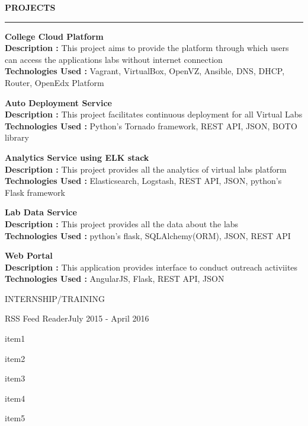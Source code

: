 \documentclass{resume} %
\begin{document}

\textbf{PROJECTS}
\sectionlineskip
\hrule
\textbf{College Cloud Platform} \\
\textbf{Description :} This project aims to provide the platform through which users can access the
applications labs without internet connection \\
\textbf{Technologies Used :} Vagrant, VirtualBox, OpenVZ, Ansible, DNS, DHCP,
Router, OpenEdx Platform

\textbf{Auto Deployment Service} \\
\textbf{Description :} This project facilitates continuous deployment for all Virtual Labs \\
\textbf{Technologies Used :} Python's Tornado framework, REST API, JSON, BOTO library

\textbf{Analytics Service using ELK stack} \\
\textbf{Description :} This project provides all the analytics of virtual labs platform \\
\textbf{Technologies Used :} Elasticsearch, Logstash, REST API, JSON, python's Flask framework

\textbf{Lab Data Service} \\
\textbf{Description :} This project provides all the data about the labs \\
\textbf{Technologies Used :} python's flask, SQLAlchemy(ORM), JSON, REST API


\textbf{Web Portal} \\
\textbf{Description :} This application provides interface to conduct outreach activiites \\
\textbf{Technologies Used :} AngularJS, Flask, REST API, JSON



\begin{rSection}{INTERNSHIP/TRAINING}

  \begin{rSubsection}
    {RSS Feed Reader}{July 2015 - April 2016}{}{}
  \item item1
  \item item2
  \item item3
  \item item4
  \item item5
 
  \end{rSubsection} 

\end{rSection} 
\end{document}
